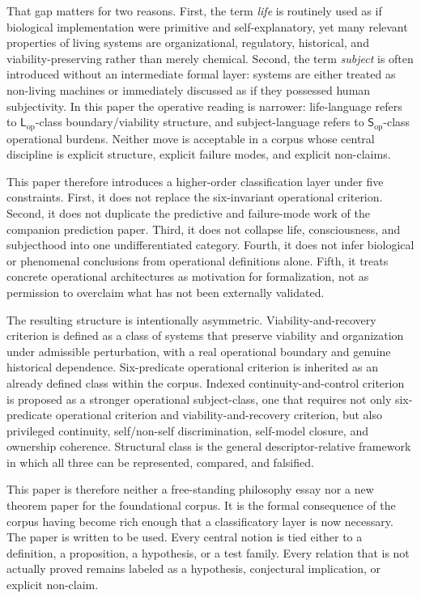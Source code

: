 \documentclass[11pt,a4paper]{article}
\theoremstyle{definition}
\newcommand{\Lop}{\mathsf{L}_{\mathrm{op}}}
\newcommand{\Subop}{\mathsf{S}_{\mathrm{op}}}
\begin{document}
That gap matters for two reasons. First, the term \emph{life} is routinely used as if biological implementation were primitive and self-explanatory, yet many relevant properties of living systems are organizational, regulatory, historical, and viability-preserving rather than merely chemical. Second, the term \emph{subject} is often introduced without an intermediate formal layer: systems are either treated as non-living machines or immediately discussed as if they possessed human subjectivity. In this paper the operative reading is narrower: life-language refers to $\Lop$-class boundary/viability structure, and subject-language refers to $\Subop$-class operational burdens. Neither move is acceptable in a corpus whose central discipline is explicit structure, explicit failure modes, and explicit non-claims.

This paper therefore introduces a higher-order classification layer under five constraints. First, it does not replace the six-invariant operational criterion. Second, it does not duplicate the predictive and failure-mode work of the companion prediction paper. Third, it does not collapse life, consciousness, and subjecthood into one undifferentiated category. Fourth, it does not infer biological or phenomenal conclusions from operational definitions alone. Fifth, it treats concrete operational architectures as motivation for formalization, not as permission to overclaim what has not been externally validated.

The resulting structure is intentionally asymmetric. Viability-and-recovery criterion is defined as a class of systems that preserve viability and organization under admissible perturbation, with a real operational boundary and genuine historical dependence. Six-predicate operational criterion is inherited as an already defined class within the corpus. Indexed continuity-and-control criterion is proposed as a stronger operational subject-class, one that requires not only six-predicate operational criterion and viability-and-recovery criterion, but also privileged continuity, self/non-self discrimination, self-model closure, and ownership coherence. Structural class is the general descriptor-relative framework in which all three can be represented, compared, and falsified.

This paper is therefore neither a free-standing philosophy essay nor a new theorem paper for the foundational corpus. It is the formal consequence of the corpus having become rich enough that a classificatory layer is now necessary. The paper is written to be used. Every central notion is tied either to a definition, a proposition, a hypothesis, or a test family. Every relation that is not actually proved remains labeled as a hypothesis, conjectural implication, or explicit non-claim.
\end{document}
